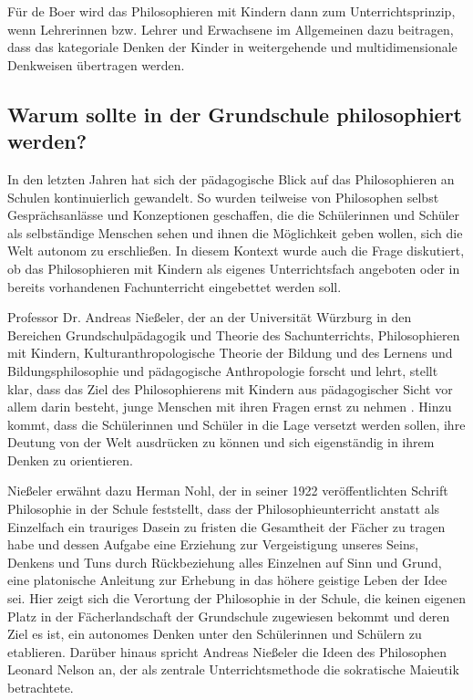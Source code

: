 Für de Boer wird das Philosophieren mit Kindern dann zum Unterrichtsprinzip, wenn Lehrerinnen bzw. Lehrer und Erwachsene im Allgemeinen dazu beitragen, dass das kategoriale Denken der Kinder in weitergehende und multidimensionale Denkweisen übertragen werden.


\newpage
\subsection{Warum sollte in der Grundschule philosophiert werden?}

In den letzten Jahren hat sich der pädagogische Blick auf das Philosophieren an Schulen kontinuierlich gewandelt. 
So wurden teilweise von Philosophen selbst Gesprächsanlässe und Konzeptionen geschaffen, die die Schülerinnen und Schüler als selbständige Menschen sehen und ihnen die Möglichkeit geben wollen, sich die Welt autonom zu erschließen\cite[S.\,617]{AN13}. 
In diesem Kontext wurde auch die Frage diskutiert, ob das Philosophieren mit Kindern als eigenes Unterrichtsfach angeboten oder in bereits vorhandenen Fachunterricht eingebettet werden soll. 

Professor Dr. Andreas Nießeler, der an der Universität Würzburg in den Bereichen Grundschulpädagogik und Theorie des Sachunterrichts, Philosophieren mit Kindern, Kulturanthropologische Theorie der Bildung und des Lernens und Bildungsphilosophie und pädagogische Anthropologie forscht und lehrt, stellt klar, dass das Ziel des Philosophierens mit Kindern aus pädagogischer Sicht vor allem darin besteht, \glqq junge Menschen mit ihren Fragen ernst zu nehmen\grqq{} \cite[S.\,617]{AN13}.
Hinzu kommt, dass die Schülerinnen und Schüler in die Lage versetzt werden sollen, ihre Deutung von der Welt ausdrücken zu können und sich eigenständig in ihrem Denken zu orientieren. 

Nießeler erwähnt dazu Herman Nohl, der in seiner 1922 veröffentlichten Schrift \glqq Philosophie in der Schule\grqq{} feststellt, dass der Philosophieunterricht \glqq anstatt als Einzelfach ein trauriges Dasein zu fristen die Gesamtheit der Fächer zu tragen habe und dessen Aufgabe eine Erziehung zur \glqq Vergeistigung unseres Seins, Denkens und Tuns durch Rückbeziehung alles Einzelnen auf Sinn und Grund, eine platonische Anleitung zur Erhebung in das höhere geistige Leben der Idee\grqq{} sei.\grqq{} \cite[S.\,618]{AN13}
Hier zeigt sich die Verortung der Philosophie in der Schule, die keinen eigenen Platz in der Fächerlandschaft der Grundschule zugewiesen bekommt und deren Ziel es ist, ein autonomes Denken unter den Schülerinnen und Schülern zu etablieren. 
Darüber hinaus spricht Andreas Nießeler die Ideen des Philosophen Leonard Nelson an, der als zentrale Unterrichtsmethode die sokratische Maieutik betrachtete. 

